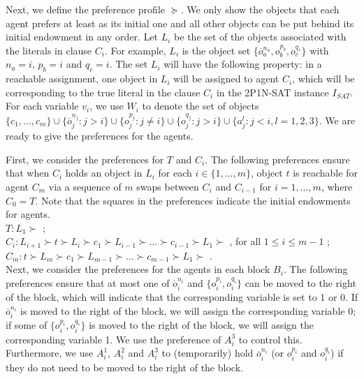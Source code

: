 Next, we define the preference profile $\succeq$. We only show the objects that each agent prefers at least as its initial one
and all other objects can be put behind its initial endowment in any order.
Let $L_i$ be the set of the objects associated with the literals in clause $C_i$. For example, $L_i$ is the object set $\{\overline{o}_a^{n_a}, {o}_b^{p_b}, {o}_c^{q_c}\}$ with $n_a=i$, $p_b=i$ and $q_c=i$.
The set $L_i$ will have the following property: in a reachable assignment, one object in $L_i$ will be assigned to agent $C_i$, which will be corresponding to the true literal in the clause $C_i$ in the
\textsc{2P1N-SAT} instance $I_{SAT}$.
For each variable $v_i$, we use $W_i$ to denote the set of objects $\{ c_1,\dots,c_m\}\cup\{ \overline{o}_j^{n_j}:j>i\}\cup\{ o_j^{p_j}:j\neq i\}\cup \{ o_j^{q_j}:j>i\}\cup\{ a_j^l:j<i,l=1,2,3\}$.
We are ready to give the preferences for the agents.


First, we consider the preferences for $T$ and $C_i$. The following preferences ensure that when
$C_i$ holds an object in $L_i$ for each $i\in \{1,\dots, m\}$, object $t$ is reachable for agent $C_m$ via a sequence of $m$ swaps between $C_i$ and $C_{i-1}$ for $i=1,\dots,m$, where $C_0=T$. Note that the squares in the preferences indicate the initial endowments for agents.\\

\noindent $T:L_1\succ$ ;\\
$C_i:L_{i+1}\succ t\succ L_i\succ c_1\succ L_{i-1}\succ \dots\succ c_{i-1}\succ L_1\succ$ , for all $1\leq i\leq m-1$ ;\\
$C_m:t\succ L_m\succ c_1\succ L_{m-1}\succ \dots\succ c_{m-1}\succ L_1\succ$ .\\


Next, we consider the preferences for the agents in each block $B_i$.
The following preferences ensure that at most one of $\overline{o}_i^{n_i}$ and $\{o_i^{p_i}, o_i^{q_i}\}$ can be moved to the right of the block,
which will indicate that the corresponding variable is set to 1 or 0. If $\overline{o}_i^{n_i}$ is moved to the right of the block, we will assign the corresponding variable 0;
if some of $\{o_i^{p_i}, o_i^{q_i}\}$ is moved to the right of the block, we will assign the corresponding variable 1.
We use the preference of $A_i^3$ to control this. Furthermore, we use $A_i^1$, $A_i^2$ and $A_i^3$ to (temporarily) hold  $\overline{o}_i^{n_i}$ (or $o_i^{p_i}$ and $o_i^{q_i}$) if they do not need
to be moved to the right of the block.\\


